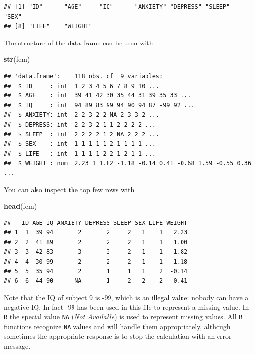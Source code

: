 \documentclass[
]{book}
\newenvironment{Shaded}{\begin{snugshade}}{\end{snugshade}}
\newcommand{\FunctionTok}[1]{\textcolor[rgb]{0.13,0.29,0.53}{\textbf{#1}}}
\newcommand{\NormalTok}[1]{#1}
\theoremstyle{definition}
\theoremstyle{definition}
\theoremstyle{definition}
\theoremstyle{definition}
\theoremstyle{remark}
\begin{document}
\begin{verbatim}
## [1] "ID"      "AGE"     "IQ"      "ANXIETY" "DEPRESS" "SLEEP"   "SEX"    
## [8] "LIFE"    "WEIGHT"
\end{verbatim}

The structure of the data frame can be seen with

\begin{Shaded}
\begin{Highlighting}[]
\FunctionTok{str}\NormalTok{(fem)}
\end{Highlighting}
\end{Shaded}

\begin{verbatim}
## 'data.frame':    118 obs. of  9 variables:
##  $ ID     : int  1 2 3 4 5 6 7 8 9 10 ...
##  $ AGE    : int  39 41 42 30 35 44 31 39 35 33 ...
##  $ IQ     : int  94 89 83 99 94 90 94 87 -99 92 ...
##  $ ANXIETY: int  2 2 3 2 2 NA 2 3 3 2 ...
##  $ DEPRESS: int  2 2 3 2 1 1 2 2 2 2 ...
##  $ SLEEP  : int  2 2 2 2 1 2 NA 2 2 2 ...
##  $ SEX    : int  1 1 1 1 1 2 1 1 1 1 ...
##  $ LIFE   : int  1 1 1 1 2 2 1 2 1 1 ...
##  $ WEIGHT : num  2.23 1 1.82 -1.18 -0.14 0.41 -0.68 1.59 -0.55 0.36 ...
\end{verbatim}

You can also inspect the top few rows with

\begin{Shaded}
\begin{Highlighting}[]
\FunctionTok{head}\NormalTok{(fem)}
\end{Highlighting}
\end{Shaded}

\begin{verbatim}
##   ID AGE IQ ANXIETY DEPRESS SLEEP SEX LIFE WEIGHT
## 1  1  39 94       2       2     2   1    1   2.23
## 2  2  41 89       2       2     2   1    1   1.00
## 3  3  42 83       3       3     2   1    1   1.82
## 4  4  30 99       2       2     2   1    1  -1.18
## 5  5  35 94       2       1     1   1    2  -0.14
## 6  6  44 90      NA       1     2   2    2   0.41
\end{verbatim}

Note that the IQ of subject 9 is -99, which is an illegal value:
nobody can have a negative IQ. In fact -99 has been used in this file
to represent a missing value. In \texttt{R} the special value
\texttt{NA} (\emph{Not Available}) is used to represent missing values. All
\texttt{R} functions recognize \texttt{NA} values and will handle them
appropriately, although sometimes the appropriate response is to stop
the calculation with an error message.
\end{document}
